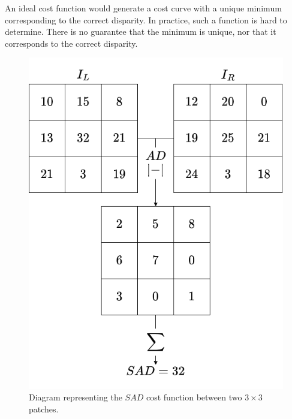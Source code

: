 An ideal cost function would generate a cost curve with a unique minimum corresponding to the correct disparity. In practice, such a function is hard to determine. There is no guarantee that the minimum is unique, nor that it corresponds to the correct disparity. 

\begin{figure}
    \centering
    \includegraphics[width=0.5\linewidth]{Images/Chap_4/SAD.png}
    \caption{Diagram representing the $SAD$ cost function between two $3\times3$ patches.}
    \label{fig:SAD}
\end{figure}

